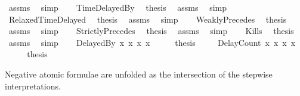 \begin{isabellebody}
\ assms\ \isamarkupfalse%
\ simp\isanewline
{}\isamarkupfalse%
\isanewline
\ \ \isamarkupfalse%
\ TimeDelayedBy\ \isamarkupfalse%
\ {\isacharquery}thesis\ \isamarkupfalse%
\ assms\ \isamarkupfalse%
\ simp\isanewline
{}\isamarkupfalse%
\isanewline
\ \ \isamarkupfalse%
\ RelaxedTimeDelayed\ \isamarkupfalse%
\ {\isacharquery}thesis\ \isamarkupfalse%
\ assms\ \isamarkupfalse%
\ simp\isanewline
{}\isamarkupfalse%
\isanewline
\ \ \isamarkupfalse%
\ WeaklyPrecedes\ \isamarkupfalse%
\ {\isacharquery}thesis\ \isamarkupfalse%
\ assms\ \isamarkupfalse%
\ simp\isanewline
{}\isamarkupfalse%
\isanewline
\ \ \isamarkupfalse%
\ StrictlyPrecedes\ \isamarkupfalse%
\ {\isacharquery}thesis\ \isamarkupfalse%
\ assms\ \isamarkupfalse%
\ simp\isanewline
{}\isamarkupfalse%
\isanewline
\ \ \isamarkupfalse%
\ Kills\ \isamarkupfalse%
\ {\isacharquery}thesis\ \isamarkupfalse%
\ assms\ \isamarkupfalse%
\ simp\isanewline
{}\isamarkupfalse%
\isanewline
\ \ \isamarkupfalse%
\ {\isacharparenleft}DelayedBy\ x{}{}{}\ x{}{}{}\ x{}{}{}\ x{}{}{}{\isacharparenright}\isanewline
\ \ \isamarkupfalse%
\ \isamarkupfalse%
\ {\isacharquery}thesis\ \isamarkupfalse%
\isanewline
{}\isamarkupfalse%
\isanewline
\ \ \isamarkupfalse%
\ {\isacharparenleft}DelayCount\ x{}{}{}\ x{}{}{}\ x{}{}{}\ x{}{}{}{\isacharparenright}\isanewline
\ \ \isamarkupfalse%
\ \isamarkupfalse%
\ {\isacharquery}thesis\ \isamarkupfalse%
\isanewline
{}\isamarkupfalse%
%
\endisatagproof
{\isafoldproof}%
%
\isadelimproof
%
\endisadelimproof
%
\begin{isamarkuptext}%
Negative atomic formulae are unfolded
  as the intersection of the stepwise interpretations.%
\end{isamarkuptext}\isamarkuptrue%

\end{isabellebody}
